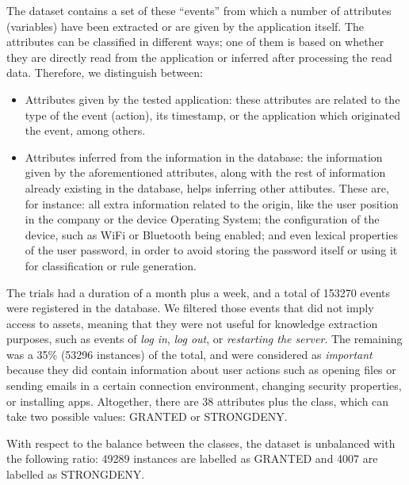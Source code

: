 \documentclass[a4paper,10pt,twocolumn,preprint,3p]{elsarticle}
\begin{document}
The dataset contains a set of these ``events'' from which a number of attributes (variables) have been extracted or are given by the application itself. The attributes can be classified in different ways; one of them is based on whether they are directly read from the application or inferred after processing the read data. Therefore, we distinguish between:
\begin{itemize}
  \item Attributes given by the tested application: these attributes
    are related to the type of the event (action), its timestamp, or
    the application which originated the event, among others. 
  \item Attributes inferred from the information in the database: the information given by the aforementioned attributes, along with the rest of information already existing in the database, helps inferring other attibutes. These are, for instance: all extra information related to the origin, like the user position in the company or the device Operating System; the configuration of the device, such as WiFi or Bluetooth being enabled; and even lexical properties of the user password, in order to avoid storing the password itself or using it for classification or rule generation.
\end{itemize}

The trials had a duration of a month plus a week, and a total of %
153270 events were registered in the database. We filtered those events that did not imply access to assets, meaning that they were not useful for
knowledge extraction purposes, such as events of \textit{log in},
\textit{log out}, or \textit{restarting the server}. %
The remaining was a 35\% (53296 instances) of the total, and were considered as \textit{important}
because they did contain information about user actions such as
opening files or sending emails in a certain connection environment,
changing security properties, or installing apps. Altogether, there
are 38 attributes plus the class, which can take two possible values:
GRANTED or STRONGDENY. 

With respect to the balance between the classes, the dataset is
unbalanced with the following ratio: 49289 instances are labelled as
GRANTED and 4007 are labelled as STRONGDENY. 
\end{document}
